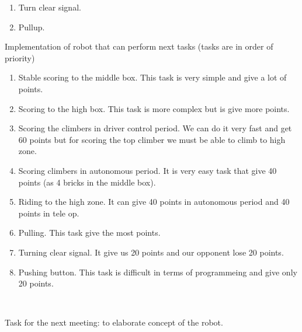 \begin{enumerate*}
\begin{enumerate}
\begin{enumerate}
	  		\item Turn clear signal.
	  		\item Pullup.
  		\end{enumerate}
  	\end{enumerate}
  	\item Implementation of robot that can perform next tasks (tasks are in order of priority)
  	\begin{enumerate}
  		\item Stable scoring to the middle box. This task is very simple and give a lot of points.
  		\item Scoring to the high box. This task is more complex but is give more points.
  		\item Scoring the climbers in driver control period. We can do it very fast and get 60 points but for scoring the top climber we must be able to climb to high zone.
  		\item Scoring climbers in autonomous period. It is very easy task that give 40 points (as 4 bricks in the middle box).
  		\item Riding to the high zone. It can give 40 points in autonomous period and 40 points in tele op.
  		\item Pulling. This task give the most points.
  		\item Turning clear signal. It give us 20 points and our opponent lose 20 points.
  		\item Pushing button. This task is difficult in terms of programmeing and give only 20 points.
  	\end{enumerate}
	 \newline
	
	Task for the next meeting: to elaborate concept of the robot.
  	
  \end{enumerate*}
  

  


\fillpage
